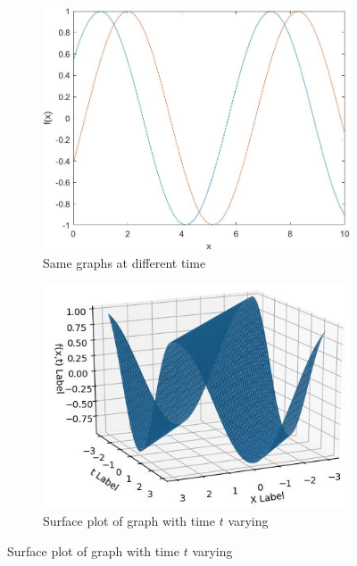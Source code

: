 \documentclass[10pt,a4paper]{article}
\begin{document}
\begin{figure} [h]
\centering
\begin{subfigure}{.5\textwidth}
  \centering
  \includegraphics[scale=0.18]{Overlaid.JPG}
  \caption{Same graphs at different time}
  \label{fig:sub1}
\end{subfigure}%
\begin{subfigure}{.5\textwidth}
  \centering
  \includegraphics[scale=0.55]{Cos_varying.JPG}
  \caption{Surface plot of graph with time $t$ varying}
  \label{fig:sub2}
\end{subfigure}
\label{fig:test}
\end{figure}
\end{document}
